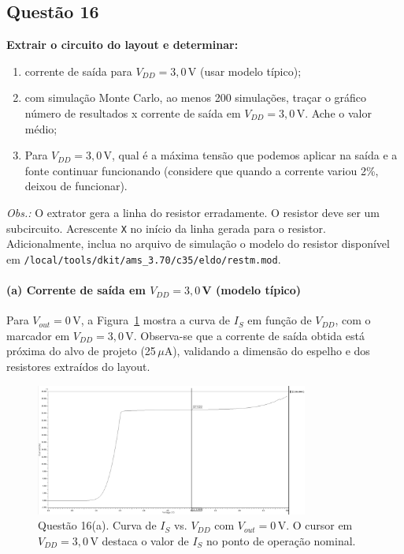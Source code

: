 \documentclass[12pt,a4paper]{article}
\begin{document}
\subsection*{Questão 16}
\begin{BoxQ}
    \textbf{Extrair o circuito do layout e determinar:}
\begin{enumerate}
    \item corrente de saída para $V_{DD} = 3{,}0$\,V (usar modelo típico);
    \item com simulação Monte Carlo, ao menos 200 simulações, traçar o gráfico número de resultados x corrente de saída em $V_{DD} = 3{,}0$\,V. Ache o valor médio;
    \item Para $V_{DD} = 3{,}0$\,V, qual é a máxima tensão que podemos aplicar na saída e a fonte continuar funcionando (considere que quando a corrente variou 2\%, deixou de funcionar).
\end{enumerate}
    	\textit{Obs.:} O extrator gera a linha do resistor erradamente. O resistor deve ser um subcircuito. Acrescente \texttt{X} no início da linha gerada para o resistor. Adicionalmente, inclua no arquivo de simulação o modelo do resistor disponível em \nolinkurl{/local/tools/dkit/ams_3.70/c35/eldo/restm.mod}.
\end{BoxQ}


\paragraph{(a) Corrente de saída em $V_{DD}=3{,}0$\,V (modelo típico)}
Para $V_{out}=0$\,V, a Figura~\ref{fig:q16a} mostra a curva de $I_S$ em função de $V_{DD}$, com o marcador em $V_{DD}=3{,}0$\,V. Observa-se que a corrente de saída obtida está próxima do alvo de projeto (25\,$\mu$A), validando a dimensão do espelho e dos resistores extraídos do layout.

\begin{figure}[H]
    \centering
    \includegraphics[width=0.8\textwidth]{images/16.1.png}
    \caption{Questão 16(a). Curva de $I_S$ vs. $V_{DD}$ com $V_{out}=0$\,V. O cursor em $V_{DD}=3{,}0$\,V destaca o valor de $I_S$ no ponto de operação nominal.}
    \label{fig:q16a}
\end{figure}
\end{document}

